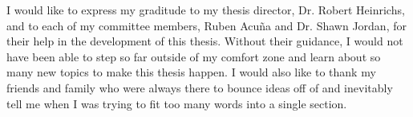 \documentclass[
11pt, %
oneside, %
english, %
singlespacing, %
final, %
headsepline, %
]{MastersDoctoralThesis} %
\begin{document}
\begin{acknowledgements}
	\addchaptertocentry{\acknowledgementname} %
	I would like to express my graditude to my thesis director, Dr. Robert Heinrichs, and to each of my committee members, Ruben Acu\~{n}a and Dr. Shawn Jordan, for their help in the development of this thesis.
	Without their guidance, I would not have been able to step so far outside of my comfort zone and learn about so many new topics to make this thesis happen.
	I would also like to thank my friends and family who were always there to bounce ideas off of and inevitably tell me when I was trying to fit too many words into a single section.
\end{acknowledgements}


\tableofcontents %

\listoffigures %

\listoftables %

\end{document}
